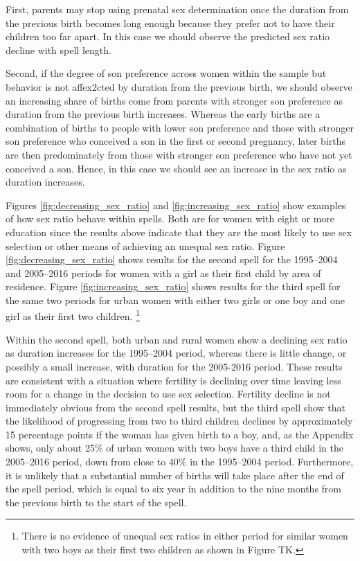 \documentclass[12pt,letterpaper]{article}
\begin{document}
First, parents may stop using prenatal sex determination 
once the duration from the previous birth becomes long enough
because they prefer not to have their children too far apart.
In this case we should observe the predicted sex ratio decline
with spell length.

Second, if the degree of son preference across women within the sample
but behavior is not affex2cted by duration from the previous birth,
we should observe an increasing share of births come from 
parents with stronger son preference as duration from the
previous birth increases.
Whereas the early births are a combination of births to
people with lower son preference and those with stronger son
preference who conceived a son in the first or second pregnancy,
later births are then predominately from those with stronger
son preference who have not yet conceived a son.
Hence, in this case we should see an increase in the sex ratio 
as duration increases.


Figures \ref{fig:decreasing_sex_ratio} and \ref{fig:increasing_sex_ratio} show
examples of how sex ratio behave within spells.
Both are for women with eight or more education since the results above indicate
that they are the most likely to use sex selection or other means of achieving 
an unequal sex ratio.
Figure \ref{fig:decreasing_sex_ratio} shows results for the second spell for
the 1995--2004 and 2005--2016 periods for women with a girl as their first
child by area of residence.
Figure \ref{fig:increasing_sex_ratio} shows results for the third spell for
the same two periods for urban women with either two girls or one boy and one
girl as their first two children.%
\footnote{
There is no evidence of unequal sex ratios in either period for similar women 
with two boys as their first two children as shown in Figure TK.
}

Within the second spell, both urban and rural women show a declining
sex ratio as duration increases for the 1995--2004 period, whereas there
is little change, or possibly a small increase, with duration for the 
2005-2016 period.
These results are consistent with a situation where fertility is declining
over time leaving less room for a change in the decision to use sex selection.
Fertility decline is not immediately obvious from the second spell 
results, but the third spell show that the likelihood of progressing from
two to third children declines by approximately 15 percentage points if
the woman has given birth to a boy, and, as the Appendix shows, only about 
25\% of urban women with two boys have a third child in the 2005--2016 period, 
down from close to 40\% in the 1995--2004 period. 
Furthermore, it is unlikely that a substantial number of births will take
place after the end of the spell period, which is equal to six year in
addition to the nine months from the previous birth to the start of the spell.
\end{document}
